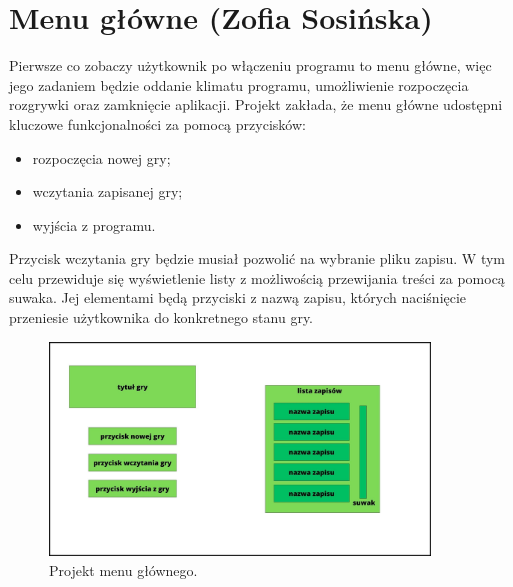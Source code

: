 \section{Menu główne (Zofia Sosińska)}\label{chap:menu_main}
Pierwsze co zobaczy użytkownik po włączeniu programu to menu główne, więc jego zadaniem będzie oddanie klimatu programu,
umożliwienie rozpoczęcia rozgrywki oraz zamknięcie aplikacji.
Projekt zakłada, że menu główne udostępni kluczowe funkcjonalności za pomocą przycisków:
\begin{itemize}
    \item rozpoczęcia nowej gry;
    \item wczytania zapisanej gry;
    \item wyjścia z programu.
\end{itemize}

Przycisk wczytania gry będzie musiał pozwolić na wybranie pliku zapisu. W tym celu przewiduje się wyświetlenie listy
z możliwością przewijania treści za pomocą suwaka. Jej elementami będą przyciski z nazwą zapisu, których naciśnięcie przeniesie 
użytkownika do konkretnego stanu gry.

\begin{figure}[htbp]
    \centering
    \includegraphics[width=0.9\textwidth]{images/ui/ui_prooj_menu.jpg}
    \caption{Projekt menu głównego.
    }\label{fig:compass}
\end{figure}
